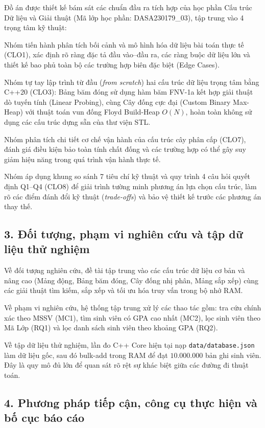 \documentclass[14pt,a4paper]{extarticle}
\begin{document}
Đồ án được thiết kế bám sát các chuẩn đầu ra tích hợp của học phần Cấu trúc Dữ liệu và Giải thuật (Mã lớp học phần: DASA230179\_03), tập trung vào 4 trọng tâm kỹ thuật:

Nhóm tiến hành phân tích bối cảnh và mô hình hóa dữ liệu bài toán thực tế (CLO1), xác định rõ ràng đặc tả đầu vào--đầu ra, các ràng buộc dữ liệu lớn và thiết kế bao phủ toàn bộ các trường hợp biên đặc biệt (Edge Cases).

Nhóm tự tay lập trình từ đầu (\textit{from scratch}) hai cấu trúc dữ liệu trọng tâm bằng C++20 (CLO3): Bảng băm đóng sử dụng hàm băm FNV-1a kết hợp giải thuật dò tuyến tính (Linear Probing), cùng Cây đống cực đại (Custom Binary Max-Heap) với thuật toán vun đống Floyd Build-Heap $O(N)$, hoàn toàn không sử dụng các cấu trúc dựng sẵn của thư viện STL.

Nhóm phân tích chi tiết cơ chế vận hành của cấu trúc cây phân cấp (CLO7), đánh giá điều kiện bảo toàn tính chất đống và các trường hợp có thể gây suy giảm hiệu năng trong quá trình vận hành thực tế.

Nhóm áp dụng khung so sánh 7 tiêu chí kỹ thuật và quy trình 4 câu hỏi quyết định Q1--Q4 (CLO8) để giải trình tường minh phương án lựa chọn cấu trúc, làm rõ các điểm đánh đổi kỹ thuật (\textit{trade-offs}) và bảo vệ thiết kế trước các phương án thay thế.

\subsection*{3. Đối tượng, phạm vi nghiên cứu và tập dữ liệu thử nghiệm}
{}

Về đối tượng nghiên cứu, đề tài tập trung vào các cấu trúc dữ liệu cơ bản và nâng cao (Mảng động, Bảng băm đóng, Cây đống nhị phân, Mảng sắp xếp) cùng các giải thuật tìm kiếm, sắp xếp và tối ưu hóa truy vấn trong bộ nhớ RAM.

Về phạm vi nghiên cứu, hệ thống tập trung xử lý các thao tác gồm: tra cứu chính xác theo MSSV (MC1), tìm sinh viên có GPA cao nhất (MC2), lọc sinh viên theo Mã Lớp (RQ1) và lọc danh sách sinh viên theo khoảng GPA (RQ2).

Về tập dữ liệu thử nghiệm, lần đo C++ Core hiện tại nạp \texttt{data/database.json} làm dữ liệu gốc, sau đó bulk-add trong RAM để đạt $10.000.000$ bản ghi sinh viên. Đây là quy mô đủ lớn để quan sát rõ rệt sự khác biệt giữa các đường đi thuật toán.

\subsection*{4. Phương pháp tiếp cận, công cụ thực hiện và bố cục báo cáo}
{}
\end{document}
